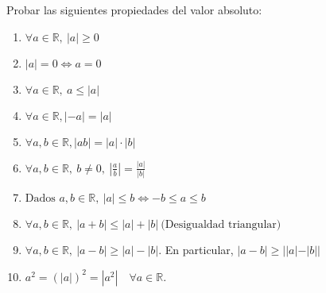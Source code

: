 


\begin{ejercicio}
    Probar las siguientes propiedades del valor absoluto:
    \begin{enumerate}
        \item $\forall a \in \mathbb{R}, ~|a| \geq 0$

        \item $|a| = 0 \Longleftrightarrow a = 0$

        \item $\forall a \in \mathbb{R}, ~a \leq |a|$

        \item $\forall a \in \mathbb{R}, |-a| = |a|$

        \item $\forall a,b \in \mathbb{R}, |ab| = |a| \cdot |b|$

        \item $\forall a,b \in \mathbb{R},~b \neq 0,~|\frac{a}{b}| =\frac{|a|}{|b|}$

        \item $\text{Dados $a,b \in \mathbb{R}$}, ~|a| \leq b \Longleftrightarrow -b \leq a \leq b$

        \item $\forall a,b \in \mathbb{R},~|a+b| \leq |a| + |b| ~\text{(Desigualdad triangular)}$

        \item $\forall a,b \in \mathbb{R},~|a-b| \geq |a| - |b|$. En particular, $|a-b| \geq ||a| - |b||$ 

        \item $a^2 = (|a|)^{2} = |a^{2}| \quad \forall a \in \mathbb{R}$.


    \end{enumerate}
\end{ejercicio}